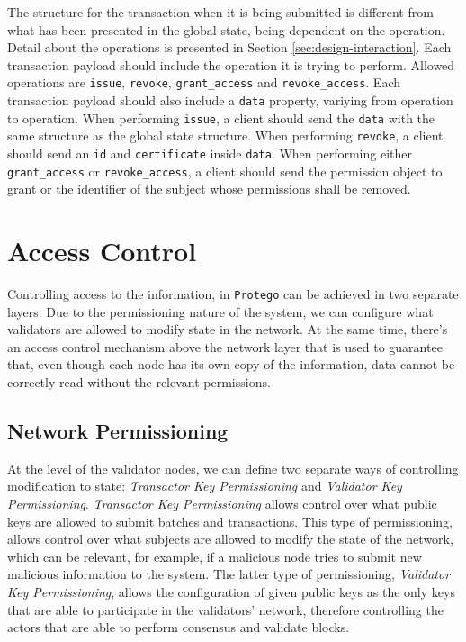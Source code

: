 The structure for the transaction when it is being submitted is different from what has been presented in the global state, being dependent on the operation. Detail about the operations is presented in Section \ref{sec:design-interaction}. Each transaction payload should include the operation it is trying to perform. Allowed operations are \texttt{issue}, \texttt{revoke}, \texttt{grant\_access} and \texttt{revoke\_access}. Each transaction payload should also include a \texttt{data} property, variying from operation to operation. When performing \texttt{issue}, a client should send the \texttt{data} with the same structure as the global state structure. When performing \texttt{revoke}, a client should send an \texttt{id} and \texttt{certificate} inside \texttt{data}. When performing either \texttt{grant\_access} or \texttt{revoke\_access}, a client should send the permission object to grant or the identifier of the subject whose permissions shall be removed.

\section{Access Control}
\label{sec:design-ac}

Controlling access to the information, in \texttt{Protego} can be achieved in two separate layers. Due to the permissioning nature of the system, we can configure what validators are allowed to modify state in the network. At the same time, there's an access control mechanism above the network layer that is used to guarantee that, even though each node has its own copy of the information, data cannot be correctly read without the relevant permissions.

\subsection{Network Permissioning}

At the level of the validator nodes, we can define two separate ways of controlling modification to state: \emph{Transactor Key Permissioning} and \textit{Validator Key Permissioning}. \emph{Transactor Key Permissioning} allows control over what public keys are allowed to submit batches and transactions. This type of permissioning, allows control over what subjects are allowed to modify the state of the network, which can be relevant, for example, if a malicious node tries to submit new malicious information to the system. The latter type of permissioning, \textit{Validator Key Permissioning}, allows the configuration of given public keys as the only keys that are able to participate in the validators' network, therefore controlling the actors that are able to perform consensus and validate blocks.

